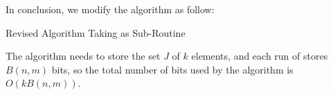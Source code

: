 In conclusion, we modify the algorithm as follow:

\begin{algorithm}
  \caption{Revised Algorithm Taking \alg as Sub-Routine}
  \label{alg:revise}
  \begin{algorithmic}
    \Require A stream $\sigma = <a_1, \cdots, a_m>, \delta$
    \Ensure Statistics $\widehat{\Phi}(\sigma)$
    \renewcommand{\algorithmicrequire}{\textbf{Input:}}
    \renewcommand{\algorithmicensure}{\textbf{Output:}}
    \algnewcommand{}
    \algnewcommand\Operation{\item[\algorithmicoperation]}
    \Operation
    \State Choose $k := \lceil 4\log \frac{1}{\delta}$
    \State Init $J := \empty$
    \State $\widetilde{\Phi}_i(\sigma} := \alg()$
    \State $J = J \cup \widetilde{\Phi}_i(\sigma}$ 
    \EndFor

    \Return The median of set $J$
  \end{algorithmic}
\end{algorithm}

The algorithm needs to store the set $J$ of $k$ elements, and each run of \alg stores $B(n,m)$ bits, so the total number of bits used by the algorithm is $O(kB(n,m))$.
